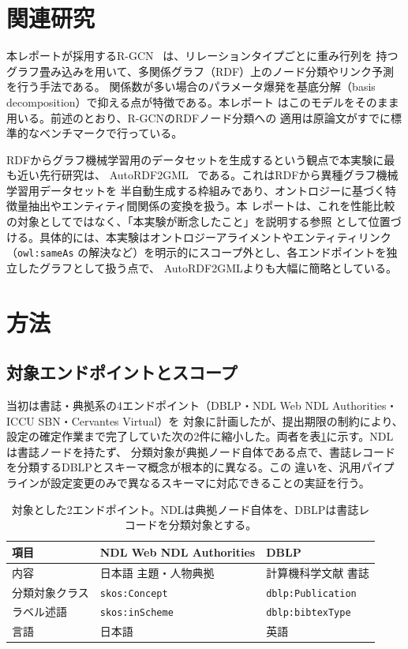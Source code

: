 \documentclass[dvipdfmx,twoside,11pt]{article}
\begin{document}
\section{関連研究}
\label{sec:related}

本レポートが採用するR-GCN~\citep{schlichtkrull2018modeling} は、リレーションタイプごとに重み行列を
持つグラフ畳み込みを用いて、多関係グラフ（RDF）上のノード分類やリンク予測を行う手法である。
関係数が多い場合のパラメータ爆発を基底分解（basis decomposition）で抑える点が特徴である。本レポート
はこのモデルをそのまま用いる。前述のとおり、R-GCNのRDFノード分類への
適用は原論文がすでに標準的なベンチマークで行っている。

RDFからグラフ機械学習用のデータセットを生成するという観点で本実験に最も近い先行研究は、
AutoRDF2GML~\citep{farber2024autordf2gml} である。これはRDFから異種グラフ機械学習用データセットを
半自動生成する枠組みであり、オントロジーに基づく特徴量抽出やエンティティ間関係の変換を扱う。本
レポートは、これを性能比較の対象としてではなく、「本実験が断念したこと」を説明する参照
として位置づける。具体的には、本実験はオントロジーアライメントやエンティティリンク（\texttt{owl:sameAs}
の解決など）を明示的にスコープ外とし、各エンドポイントを独立したグラフとして扱う点で、
AutoRDF2GMLよりも大幅に簡略としている。

\section{方法}
\label{sec:method}

\subsection{対象エンドポイントとスコープ}

当初は書誌・典拠系の4エンドポイント（DBLP・NDL Web NDL Authorities・ICCU SBN・Cervantes Virtual）を
対象に計画したが、提出期限の制約により、設定の確定作業まで完了していた次の2件に縮小した。両者を表\ref{tab:endpoints}に示す。NDLは書誌ノードを持たず、
分類対象が典拠ノード自体である点で、書誌レコードを分類するDBLPとスキーマ概念が根本的に異なる。この
違いを、汎用パイプラインが設定変更のみで異なるスキーマに対応できることの実証を行う。

\begin{table}[t]
\centering
\caption{対象とした2エンドポイント。NDLは典拠ノード自体を、DBLPは書誌レコードを分類対象とする。}
\label{tab:endpoints}
\begin{tabular}{lll}
\toprule
項目 & NDL Web NDL Authorities & DBLP \\
\midrule
内容 & 日本語 主題・人物典拠 & 計算機科学文献 書誌 \\
分類対象クラス & \texttt{skos:Concept} & \texttt{dblp:Publication} \\
ラベル述語 & \texttt{skos:inScheme} & \texttt{dblp:bibtexType} \\
言語 & 日本語 & 英語 \\
\bottomrule
\end{tabular}
\end{table}
\end{document}
